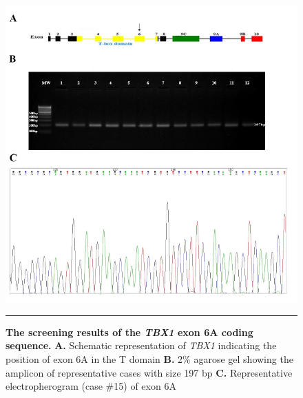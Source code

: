 \begin{refsection}
\begin{figure}[!thbp]
\centering
\includegraphics[width=\linewidth]{Figures/Figure4_7TBX6A.pdf}
\rule{35em}{0.5pt}
\caption{\textbf{The screening results of the \textit{TBX1} exon 6A coding sequence.}
\textbf{A.} Schematic representation of \textit{TBX1} indicating the position of exon 6A in the T domain \textbf{B.} 2\% agarose gel showing the amplicon of representative cases with size 197 bp \textbf{C.} Representative electropherogram (case \#15) of exon 6A}
\label{fig:4_7}
\end{figure}



\end{refsection}
